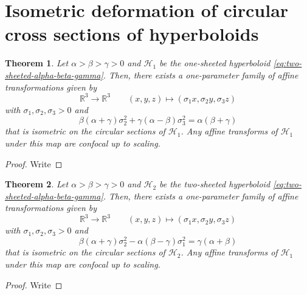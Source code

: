\documentclass[10pt, a4paper]{article}
\theoremstyle{BoldTopSpacing}
\newtheorem{theorem}{Theorem}[section]
\theoremstyle{BoldTopSpacing}
\theoremstyle{BoldTopSpacing}
\theoremstyle{BoldTopBottomSpacing}
\theoremstyle{BoldTopSpacing}
\theoremstyle{BoldTopBottomSpacing}
\theoremstyle{remark}
\begin{document}
\section{Isometric deformation of circular cross sections of hyperboloids}
\begin{theorem}
\label{thm:affine-transformation-one-sheeted}
Let $\alpha > \beta > \gamma > 0$ and $\mathcal{H}_{1}$ be the one-sheeted hyperboloid \eqref{eq:two-sheeted-alpha-beta-gamma}. Then, there exists a one-parameter family of affine transformations given by
\[
    \mathbb{R}^3 \to \mathbb{R}^3 \quad \quad (x, y, z) \mapsto (\sigma_{1}x, \sigma_{2}y, \sigma_{3}z)
\]
with $\sigma_{1}, \sigma_{2}, \sigma_{3} > 0$ and
\begin{equation}
    \beta(\alpha + \gamma) \sigma_{2}^2 + \gamma(\alpha - \beta) \sigma_{3}^2 = \alpha (\beta + \gamma)
\end{equation}
that is isometric on the circular sections of $\mathcal{H}_{1}$. Any affine transforms of $\mathcal{H}_1$ under this map are confocal up to scaling.
\end{theorem}
\begin{proof}
    Write
\end{proof}

\begin{theorem}
\label{thm:affine-transformation-two-hyperboloid}
Let $\alpha > \beta > \gamma > 0$ and $\mathcal{H}_{2}$ be the two-sheeted hyperboloid \eqref{eq:two-sheeted-alpha-beta-gamma}. Then, there exists a one-parameter family of affine transformations given by
\[
    \mathbb{R}^3 \to \mathbb{R}^3 \quad \quad (x, y, z) \mapsto (\sigma_{1}x, \sigma_{2}y, \sigma_{3}z)
\]
with $\sigma_{1}, \sigma_{2}, \sigma_{3} > 0$ and
\begin{equation}
    \beta (\alpha + \gamma) \sigma_{2}^2 - \alpha (\beta - \gamma) \sigma_{1}^2 = \gamma (\alpha + \beta)
\end{equation}
that is isometric on the circular sections of $\mathcal{H}_{2}$. Any affine transforms of $\mathcal{H}_1$ under this map are confocal up to scaling.
\end{theorem}
\begin{proof}
    Write
\end{proof}
\end{document}
